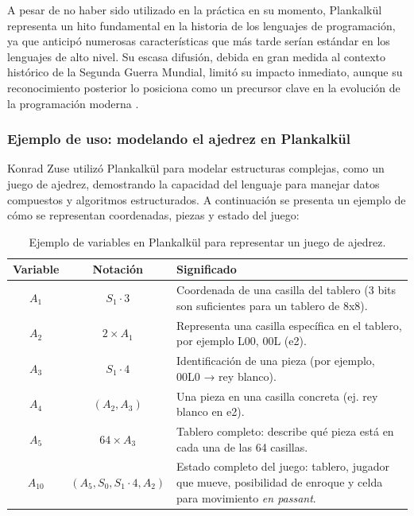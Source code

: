 \documentclass[12pt]{article}
\begin{document}
A pesar de no haber sido utilizado en la práctica en su momento, Plankalkül representa un hito fundamental en la historia de los lenguajes de programación, ya que anticipó numerosas características que más tarde serían estándar en los lenguajes de alto nivel. Su escasa difusión, debida en gran medida al contexto histórico de la Segunda Guerra Mundial, limitó su impacto inmediato, aunque su reconocimiento posterior lo posiciona como un precursor clave en la evolución de la programación moderna \cite{sebesta}.

\subsubsection*{Ejemplo de uso: modelando el ajedrez en Plankalkül}

Konrad Zuse utilizó Plankalkül para modelar estructuras complejas, como un juego de ajedrez, demostrando la capacidad del lenguaje para manejar datos compuestos y algoritmos estructurados. A continuación se presenta un ejemplo de cómo se representan coordenadas, piezas y estado del juego:

\begin{table}[h]
	\centering
	\begin{tabular}{|c|c|p{8cm}|}
		\hline
		\textbf{Variable} & \textbf{Notación} & \textbf{Significado} \\
		\hline
		$A_1$ & $S_1 \cdot 3$ & Coordenada de una casilla del tablero (3 bits son suficientes para un tablero de 8x8). \\
		\hline
		$A_2$ & $2 \times A_1$ & Representa una casilla específica en el tablero, por ejemplo L00, 00L (e2). \\
		\hline
		$A_3$ & $S_1 \cdot 4$ & Identificación de una pieza (por ejemplo, 00L0 → rey blanco). \\
		\hline
		$A_4$ & $(A_2, A_3)$ & Una pieza en una casilla concreta (ej. rey blanco en e2). \\
		\hline
		$A_5$ & $64 \times A_3$ & Tablero completo: describe qué pieza está en cada una de las 64 casillas. \\
		\hline
		$A_{10}$ & $(A_5, S_0, S_1 \cdot 4, A_2)$ & Estado completo del juego: tablero, jugador que mueve, posibilidad de enroque y celda para movimiento \textit{en passant}. \\
		\hline
	\end{tabular}
	\caption{Ejemplo de variables en Plankalkül para representar un juego de ajedrez.}
	\label{tab:plankalkul-ajedrez}
\end{table}
\end{document}
